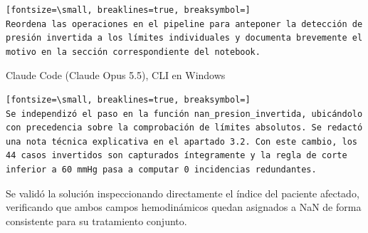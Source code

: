 \documentclass[12pt,a4paper,oneside]{book}
\begin{document}
\begin{iaprompt}
\begin{Verbatim}[fontsize=\small, breaklines=true, breaksymbol=]
Reordena las operaciones en el pipeline para anteponer la detección de presión invertida a los límites individuales y documenta brevemente el motivo en la sección correspondiente del notebook.
\end{Verbatim}
\end{iaprompt}
\begin{iaresp}{Claude Code (Claude Opus 5.5), CLI en Windows}
\begin{Verbatim}[fontsize=\small, breaklines=true, breaksymbol=]
Se independizó el paso en la función nan_presion_invertida, ubicándolo con precedencia sobre la comprobación de límites absolutos. Se redactó una nota técnica explicativa en el apartado 3.2. Con este cambio, los 44 casos invertidos son capturados íntegramente y la regla de corte inferior a 60 mmHg pasa a computar 0 incidencias redundantes.
\end{Verbatim}
\end{iaresp}
\begin{iaanalisis}
Se validó la solución inspeccionando directamente el índice del paciente afectado, verificando que ambos campos hemodinámicos quedan asignados a NaN de forma consistente para su tratamiento conjunto.
\end{iaanalisis}
\end{document}
